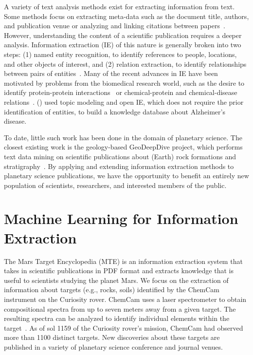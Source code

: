 \documentclass[letterpaper]{article} %
\begin{document}
A variety of text analysis methods exist for extracting information
from text.  Some methods focus on extracting meta-data such as the
document title, authors, and publication venue or analyzing and
linking citations between papers~\cite{ronzano:scipub16}.
%
However, understanding the content of a scientific publication
requires a deeper analysis.  Information extraction (IE) of this
nature is generally broken into two steps: (1) named entity
recognition, to identify references to people, locations, and other
objects of interest, and (2) relation extraction, to identify
relationships between pairs of entities~\cite{mooney:ie05}.  Many of
the recent advances in IE have been motivated by problems from the
biomedical research world, such as the desire to identify
protein-protein interactions~\cite{tikk:protein10,bui:protein11} or
chemical-protein and chemical-disease
relations~\cite{krallinger:chemistry17}.  \citeauthor{tsutsui:ad16}
(\citeyear{tsutsui:ad16}) used topic modeling and open IE, which does
not require the prior identification of entities, to build a knowledge
database about Alzheimer's disease.

To date, little such work has been done in the domain of planetary
science. The closest existing work is the geology-based GeoDeepDive
project, which performs text data mining on scientific publications
about (Earth) rock formations and
stratigraphy~\cite{zhang:geodeepdive13}.
%
By applying and extending information extraction methods to planetary
science publications, we have the opportunity to benefit an entirely
new population of scientists, researchers, and interested members of
the public.

\section{Machine Learning for Information Extraction}

The Mars Target Encyclopedia (MTE) is an information extraction system
that takes in scientific publications in PDF format and extracts
knowledge that is useful to scientists studying the planet Mars.
%
We focus on the extraction of information about targets (e.g., rocks,
soils) identified by the ChemCam instrument on the Curiosity rover.
ChemCam uses a laser spectrometer to obtain compositional spectra from
up to seven meters away from a given target. The resulting spectra can
be analyzed to identify individual elements within the
target~\cite{maurice:chemcam12}.  As of sol 1159 of the Curiosity
rover's mission, ChemCam had observed more than 1100 distinct targets.
New discoveries about these targets are published in a variety of
planetary science conference and journal venues.
\end{document}
